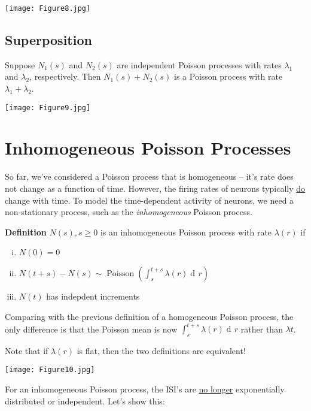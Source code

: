 \documentclass[11pt]{article}
\DeclareMathOperator{\dif}{d\!}
\DeclareMathOperator{\Poisson}{Poisson}
\newenvironment{propertybox}{%
   \def\FrameCommand{\colorbox{LightSteelBlue}}%
   \MakeFramed{\advance\hsize-\width \FrameRestore}}
 {\endMakeFramed}
\begin{document}
\begin{center}
\texttt{[image: Figure8.jpg]}
\end{center}

\subsection{Superposition}
Suppose $N_1(s)$ and $N_2(s)$ are independent Poisson processes with rates $\lambda_1$ and $\lambda_2$, respectively. Then
$N_1(s) + N_2(s)$ is a Poisson process with rate $\lambda_1 + \lambda_2$.

\begin{center}
\texttt{[image: Figure9.jpg]}
\end{center}

\section{Inhomogeneous Poisson Processes}
So far, we've considered a Poisson process that is homogeneous -- it's rate does not change as a function of time. However,
the firing rates of neurons typically \underline{do} change with time. To model the time-dependent activity of neurons, we need
a non-stationary process, such as the \emph{inhomogeneous} Poisson process.

\begin{propertybox}
{\bf Definition} $N(s), s \geq 0$ is an inhomogeneous Poisson process with rate $\lambda(r)$ if
\begin{enumerate}[(i)]
\item $N(0) = 0$
\item $N(t + s) - N(s) \sim \Poisson(\int_s^{t+s} \lambda(r) \dif r)$
\item $N(t)$ has indepdent increments
\end{enumerate}
\end{propertybox}
Comparing with the previous definition of a homogeneous Poisson process, the only difference is that the Poisson mean is now
$\int_s^{t+s} \lambda(r) \dif r$ rather than $\lambda t$.

Note that if $\lambda(r)$ is flat, then the two definitions are equivalent!

\begin{center}
\texttt{[image: Figure10.jpg]}
\end{center}

For an inhomogeneous Poisson process, the ISI's are \underline{no longer} exponentially distributed or independent. Let's show this:
\end{document}
